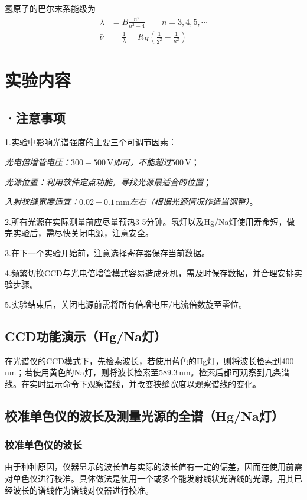 \documentclass[UTF-8,twoside,cs4size]{ctexart}
\newcommand*{\tab}{\indent}
\begin{document}
	氢原子的巴尔末系能级为
	\begin{align*}
		\lambda&=B\frac{n^2}{n^2-4}\qquad n=3,4,5,\cdots\\
		\bar\nu&=\frac1\lambda=R_H\left(\frac{1}{2^2}-\frac{1}{n^2}\right)
	\end{align*}
	
	\section{实验内容}
	\subsection*{·注意事项}
	1.实验中影响光谱强度的主要三个可调节因素：
	
	\tab\tab \textit{光电倍增管电压：$ 300-500\,\mathrm V $即可，不能超过$ 500\,\mathrm V $}；
	
	\tab\tab \textit{光源位置：利用软件定点功能，寻找光源最适合的位置}；
	
	\tab\tab \textit{入射狭缝宽度适宜：$ 0.02-0.1\,\mathrm{mm} $左右（根据光源情况作适当调整）}。
	
	2.所有光源在实际测量前应尽量预热3-5分钟。氢灯以及Hg/Na灯使用寿命短，做完实验后，需尽快关闭电源，注意安全。
	
	3.在下一个实验开始前，注意选择寄存器保存当前数据。
	
	4.频繁切换CCD与光电倍增管模式容易造成死机，需及时保存数据，并合理安排实验步骤。
	
	5.实验结束后，关闭电源前需将所有倍增电压/电流倍数旋至零位。
	\subsection{CCD功能演示（Hg/Na灯）}
	在光谱仪的CCD模式下，先检索波长，若使用蓝色的Hg灯，则将波长检索到400\,nm；若使用黄色的Na灯，则将波长检索至589.3\,nm。检索后都可观察到几条谱线。在实时显示命令下观察谱线，并改变狭缝宽度以观察谱线的变化。
	
	\subsection{校准单色仪的波长及测量光源的全谱（Hg/Na灯）}
	\subsubsection{校准单色仪的波长}
	由于种种原因，仪器显示的波长值与实际的波长值有一定的偏差，因而在使用前需对单色仪进行校准。具体做法是使用一个或多个能发射线状光谱线的光源，用其已经波长的谱线作为谱线对仪器进行校准。
	
\end{document}

